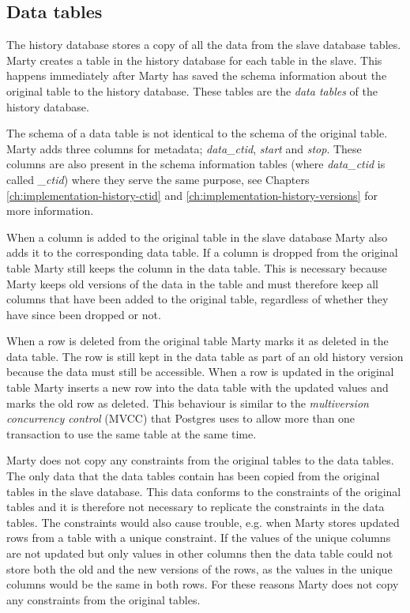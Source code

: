 \subsection{Data tables}
\label{ch:implementation-history-data}
The history database stores a copy of all the data from the slave database tables.
Marty creates a table in the history database for each table in the slave.
This happens immediately after Marty has saved the schema information about the original table to the history database.
These tables are the \textit{data tables} of the history database.

The schema of a data table is not identical to the schema of the original table.
Marty adds three columns for metadata; \textit{data\_ctid}, \textit{start} and \textit{stop}.
These columns are also present in the schema information tables (where \textit{data\_ctid} is called \textit{\_ctid}) where they serve the same purpose, see Chapters \ref{ch:implementation-history-ctid} and \ref{ch:implementation-history-versions} for more information.

When a column is added to the original table in the slave database Marty also adds it to the corresponding data table.
If a column is dropped from the original table Marty still keeps the column in the data table.
This is necessary because Marty keeps old versions of the data in the table and must therefore keep all columns that have been added to the original table, regardless of whether they have since been dropped or not.

When a row is deleted from the original table Marty marks it as deleted in the data table.
The row is still kept in the data table as part of an old history version because the data must still be accessible.
When a row is updated in the original table Marty inserts a new row into the data table with the updated values and marks the old row as deleted.
This behaviour is similar to the \textit{multiversion concurrency control} (MVCC) that Postgres uses to allow more than one transaction to use the same table at the same time.

Marty does not copy any constraints from the original tables to the data tables.
The only data that the data tables contain has been copied from the original tables in the slave database.
This data conforms to the constraints of the original tables and it is therefore not necessary to replicate the constraints in the data tables.
The constraints would also cause trouble, e.g. when Marty stores updated rows from a table with a unique constraint.
If the values of the unique columns are not updated but only values in other columns then the data table could not store both the old and the new versions of the rows, as the values in the unique columns would be the same in both rows.
For these reasons Marty does not copy any constraints from the original tables.

